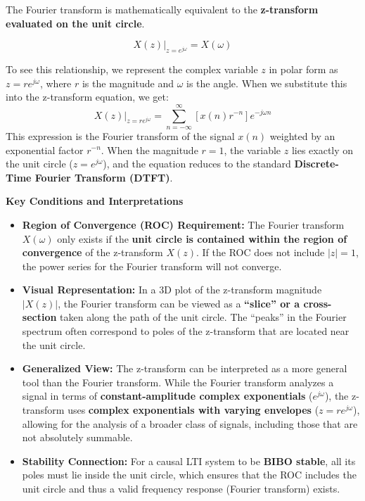 The Fourier transform is mathematically equivalent to the
\textbf{z-transform evaluated on the unit circle}.

\[X(z)|_{z=e^{j\omega}} = X(\omega)\]

To see this relationship, we represent the complex variable \(z\) in
polar form as \(z = re^{j\omega}\), where \(r\) is the magnitude and
\(\omega\) is the angle. When we substitute this into the z-transform
equation, we get:
\[X(z)|_{z=re^{j\omega}} = \sum_{n=-\infty}^{\infty} [x(n)r^{-n}]e^{-j\omega n}\]
This expression is the Fourier transform of the signal \(x(n)\) weighted
by an exponential factor \(r^{-n}\). When the magnitude
\textbf{\(r = 1\)}, the variable \(z\) lies exactly on the unit circle
(\(z = e^{j\omega}\)), and the equation reduces to the standard
\textbf{Discrete-Time Fourier Transform (DTFT)}.

\textbf{Key Conditions and Interpretations}

\begin{itemize}
\tightlist
\item
  \textbf{Region of Convergence (ROC) Requirement:} The Fourier
  transform \(X(\omega)\) only exists if the \textbf{unit circle is
  contained within the region of convergence} of the z-transform
  \(X(z)\). If the ROC does not include \(|z|=1\), the power series for
  the Fourier transform will not converge.
\item
  \textbf{Visual Representation:} In a 3D plot of the z-transform
  magnitude \(|X(z)|\), the Fourier transform can be viewed as a
  \textbf{``slice'' or a cross-section} taken along the path of the unit
  circle. The ``peaks'' in the Fourier spectrum often correspond to
  poles of the z-transform that are located near the unit circle.
\item
  \textbf{Generalized View:} The z-transform can be interpreted as a
  more general tool than the Fourier transform. While the Fourier
  transform analyzes a signal in terms of \textbf{constant-amplitude
  complex exponentials} (\(e^{j\omega}\)), the z-transform uses
  \textbf{complex exponentials with varying envelopes}
  (\(z = re^{j\omega}\)), allowing for the analysis of a broader class
  of signals, including those that are not absolutely summable.
\item
  \textbf{Stability Connection:} For a causal LTI system to be
  \textbf{BIBO stable}, all its poles must lie inside the unit circle,
  which ensures that the ROC includes the unit circle and thus a valid
  frequency response (Fourier transform) exists.
\end{itemize}

